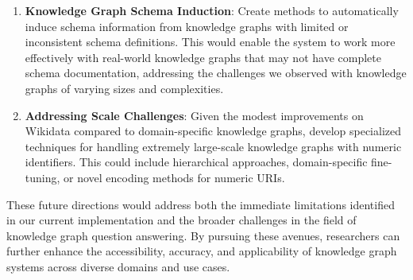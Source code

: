 \begin{enumerate}
    \item \textbf{Knowledge Graph Schema Induction}: Create methods to automatically induce schema information from knowledge graphs with limited or inconsistent schema definitions. This would enable the system to work more effectively with real-world knowledge graphs that may not have complete schema documentation, addressing the challenges we observed with knowledge graphs of varying sizes and complexities.
    
    \item \textbf{Addressing Scale Challenges}: Given the modest improvements on Wikidata compared to domain-specific knowledge graphs, develop specialized techniques for handling extremely large-scale knowledge graphs with numeric identifiers. This could include hierarchical approaches, domain-specific fine-tuning, or novel encoding methods for numeric URIs.
    
\end{enumerate}

These future directions would address both the immediate limitations identified in our current implementation and the broader challenges in the field of knowledge graph question answering. By pursuing these avenues, researchers can further enhance the accessibility, accuracy, and applicability of knowledge graph systems across diverse domains and use cases.